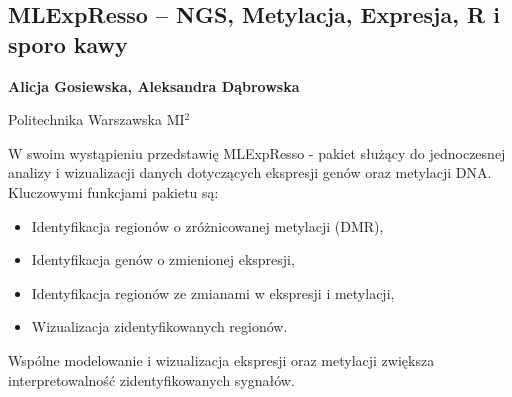 \documentclass[\main/boa.tex]{subfiles}
\begin{document}
\subsection{MLExpResso – NGS, Metylacja, Expresja, R i sporo kawy}

\begin{minipage}{0.915\textwidth}
	\centering
  {\bf {} Alicja Gosiewska,  Aleksandra Dąbrowska}
\end{minipage}


\begin{affiliations}
\begin{minipage}{0.915\textwidth}
\centering
Politechnika Warszawska MI$^{2}$ \\[-2pt]
\end{minipage}
\end{affiliations}

\vskip 0.3cm

 W swoim wystąpieniu przedstawię MLExpResso - pakiet służący do jednoczesnej analizy i wizualizacji danych dotyczących ekspresji genów oraz metylacji DNA. 
 Kluczowymi funkcjami pakietu są: 
 \begin{itemize}[noitemsep]
 \item Identyfikacja regionów o zróżnicowanej metylacji (DMR), 
 \item Identyfikacja genów o zmienionej ekspresji, 
 \item Identyfikacja regionów ze zmianami w ekspresji i metylacji,
 \item Wizualizacja zidentyfikowanych regionów.
 \end{itemize}
 
 Wspólne modelowanie i wizualizacja ekspresji oraz metylacji zwiększa interpretowalność zidentyfikowanych sygnałów.
 
\end{document}
